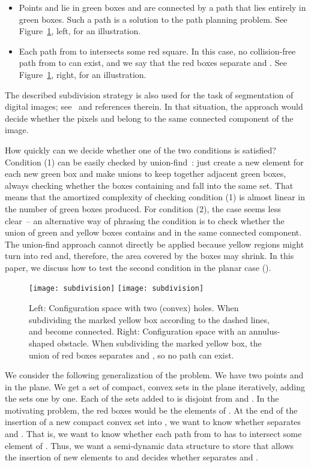 \documentclass[a4paper,11pt]{article}
\begin{document}
\begin{itemize}
\item[(1)] Points  and  lie in green boxes and are connected by a path that lies entirely in green boxes. Such a path is a solution to the path planning problem.
See Figure~\ref{fig:problem_illustration}, left, for an illustration.
\item[(2)] Each path from  to  intersects some red square.
In this case, no collision-free path from  to  can exist, and
we say that the red boxes separate  and .
See Figure~\ref{fig:problem_illustration}, right, for an illustration.
\end{itemize}

The described subdivision strategy is also used for the task of segmentation of digital images; see~\cite{aizawa} and references therein.
In that situation, the approach would decide whether the pixels  and  belong to the same connected component of the image.

How quickly can we decide whether one of the two conditions is satisfied?
Condition (1) can be easily checked by union-find~\cite{tarjan}: just create a new element
for each new green box and make unions to keep together adjacent green boxes, 
always checking whether the boxes containing  and  fall into the same set. 
That means that the amortized complexity
of checking condition (1) is almost linear in the number of green boxes produced.
For condition (2), the case seems less clear~-- an alternative way of phrasing
the condition is to check whether the union of green and yellow boxes contains
 and  in the same connected component. The union-find approach cannot directly be applied
because yellow regions might turn into red and, therefore, the area covered by the boxes
may shrink.
In this paper, we discuss how to test the second condition in the planar case ().

\begin{figure}[thb]
\centering
	\texttt{[image: subdivision]}
	\hspace{0.5cm}
	\texttt{[image: subdivision]}
	\caption{Left: Configuration space with two (convex) holes. 
	When subdividing the marked yellow box according to the dashed lines,  and  become connected.
	Right: Configuration space with an annulus-shaped obstacle. When subdividing the marked yellow box, the union
	of red boxes separates  and , so no path can exist.}
	\label{fig:problem_illustration}
\end{figure}

We consider the following generalization of the problem.
We have two points  and  in the plane.
We get a set  of compact, convex sets in the plane
iteratively, adding the sets one by one. 
Each of the sets added to  is disjoint from  and .
In the motivating problem,
the red boxes would be the elements of .
At the end of the insertion of a new compact convex set into , 
we want to know whether  separates  and . That is,
we want to know whether each path from  to  has to intersect
some element of .
Thus, we want a semi-dynamic data structure to store  that
allows the insertion of new elements to  and decides whether
 separates  and .
\end{document}

